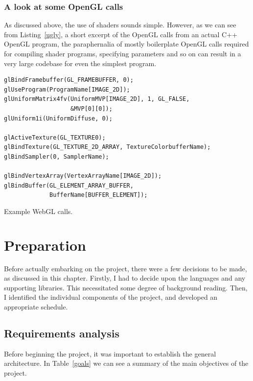 \documentclass[12pt,twoside,notitlepage]{report}
\begin{document}
\subsection{A look at some OpenGL calls}
As discussed above, the use of shaders sounds simple. However, as we can see from Listing~\ref{ugly}, a short excerpt of the OpenGL calls from an actual C++ OpenGL program\citep{samples}, the paraphernalia of mostly boilerplate OpenGL calls required for compiling shader programs, specifying parameters and so on can result in a very large codebase for even the simplest program.

\begin{listing}
\begin{verbatim}
glBindFramebuffer(GL_FRAMEBUFFER, 0);
glUseProgram(ProgramName[IMAGE_2D]);
glUniformMatrix4fv(UniformMVP[IMAGE_2D], 1, GL_FALSE, 
                   &MVP[0][0]);
glUniform1i(UniformDiffuse, 0);

glActiveTexture(GL_TEXTURE0);
glBindTexture(GL_TEXTURE_2D_ARRAY, TextureColorbufferName);
glBindSampler(0, SamplerName);

glBindVertexArray(VertexArrayName[IMAGE_2D]);
glBindBuffer(GL_ELEMENT_ARRAY_BUFFER, 
             BufferName[BUFFER_ELEMENT]);
\end{verbatim}
\caption{Example WebGL calls.\label{ugly}}
\end{listing}

\cleardoublepage
\chapter{Preparation}
Before actually embarking on the project, there were a few decisions to be made, as discussed in this chapter. Firstly, I had to decide upon the languages and any supporting libraries. This necessitated some degree of background reading. Then, I identified the individual components of the project, and developed an appropriate schedule.

\section{Requirements analysis}
Before beginning the project, it was important to establish the general architecture. In Table~\ref{goals} we can see a summary of the main objectives of the project.
\end{document}
